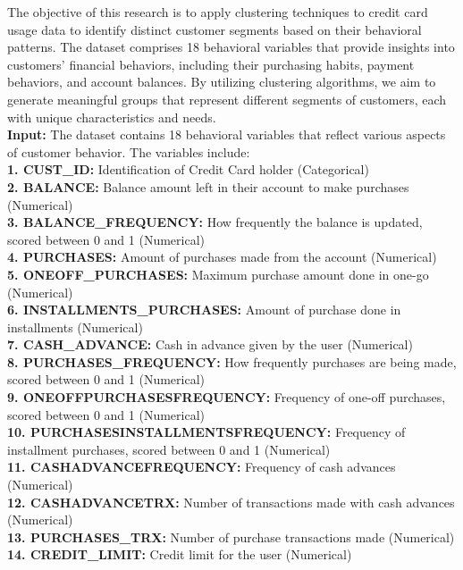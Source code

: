 \documentclass[runningheads,a4paper]{llncs}
\begin{document}
The objective of this research is to apply clustering techniques to credit card usage data to identify distinct customer segments based on their behavioral patterns. The dataset comprises 18 behavioral variables that provide insights into customers' financial behaviors, including their purchasing habits, payment behaviors, and account balances. By utilizing clustering algorithms, we aim to generate meaningful groups that represent different segments of customers, each with unique characteristics and needs. \\

\textbf{Input:} The dataset contains 18 behavioral variables that reflect various aspects of customer behavior. The variables include:
\\
\textbf{1. CUST\_ID:} Identification of Credit Card holder (Categorical) \\
\textbf{2. BALANCE:} Balance amount left in their account to make purchases (Numerical) \\
\textbf{3. BALANCE\_FREQUENCY:} How frequently the balance is updated, scored between 0 and 1 (Numerical) \\
\textbf{4. PURCHASES:} Amount of purchases made from the account (Numerical) \\
\textbf{5. ONEOFF\_PURCHASES:} Maximum purchase amount done in one-go (Numerical) \\
\textbf{6. INSTALLMENTS\_PURCHASES:} Amount of purchase done in installments (Numerical) \\
\textbf{7. CASH\_ADVANCE:} Cash in advance given by the user (Numerical) \\
\textbf{8. PURCHASES\_FREQUENCY:} How frequently purchases are being made, scored between 0 and 1 (Numerical) \\
\textbf{9. ONEOFFPURCHASESFREQUENCY:} Frequency of one-off purchases, scored between 0 and 1 (Numerical) \\
\textbf{10. PURCHASESINSTALLMENTSFREQUENCY:} Frequency of installment purchases, scored between 0 and 1 (Numerical) \\
\textbf{11. CASHADVANCEFREQUENCY:} Frequency of cash advances (Numerical) \\
\textbf{12. CASHADVANCETRX:} Number of transactions made with cash advances (Numerical) \\
\textbf{13. PURCHASES\_TRX:} Number of purchase transactions made (Numerical) \\
\textbf{14. CREDIT\_LIMIT:} Credit limit for the user (Numerical) \\
\end{document}

